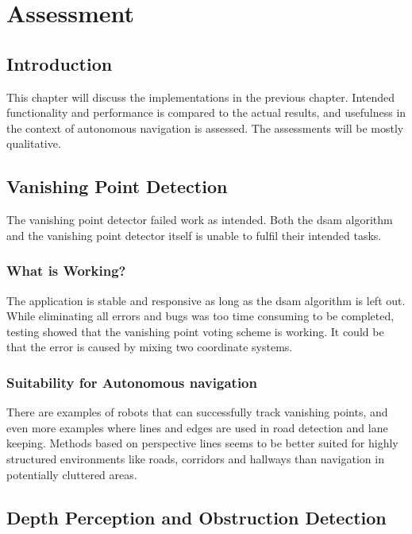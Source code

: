 \chapter{Assessment}\label{chp:assessment}

\section{Introduction}

This chapter will discuss the implementations in the previous chapter. Intended functionality and performance is compared to the actual results, and usefulness in the context of autonomous navigation is assessed. The assessments will be mostly qualitative.

\section{Vanishing Point Detection}

The vanishing point detector failed work as intended. Both the \gls{dsam} algorithm and the vanishing point detector itself is unable to fulfil their intended tasks. 

\subsection{What is Working?}

The application is stable and responsive as long as the \gls{dsam} algorithm is left out. While eliminating all errors and bugs was too time consuming to be completed, testing showed that the vanishing point voting scheme is working. It could be that the error is caused by mixing two coordinate systems. 

\subsection{Suitability for Autonomous navigation}

There are examples of robots that can successfully track  vanishing points\cite{monocularvp}, and even more examples where lines and edges are used in road detection and lane keeping. Methods based on perspective lines seems to be better suited for highly structured environments like roads, corridors and hallways than navigation in potentially cluttered areas.

\section{Depth Perception and Obstruction Detection}

